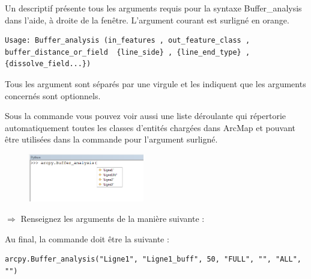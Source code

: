 \documentclass[11pt]{article}
\newcommand{\action}{$\Rightarrow$ }
\newcommand{\code}[1]{\lstinline{#1}}
\begin{document}
Un descriptif présente tous les arguments requis pour la syntaxe Buffer\_analysis dans l’aide, à droite de la fenêtre. L'argument courant est surligné en orange.
\begin{lstlisting}
Usage: Buffer_analysis (in_features , out_feature_class , buffer_distance_or_field  {line_side} , {line_end_type} , {dissolve_field...})
\end{lstlisting}

Tous les argument sont séparés par une virgule et les {} indiquent que les arguments concernés sont optionnels.

Sous la commande vous pouvez voir aussi une liste déroulante qui répertorie automatiquement toutes les classes d'entités chargées dans ArcMap et pouvant être utilisées dans la commande pour l'argument surligné.
\begin{figure}[H]
	\center \includegraphics[width=0.45\textwidth]{img/td3/python_console_aide.png}\\
\end{figure}

\action Renseignez les arguments de la manière suivante :

Au final, la commande doit être la suivante :
\begin{lstlisting}
arcpy.Buffer_analysis("Ligne1", "Ligne1_buff", 50, "FULL", "", "ALL", "")
\end{lstlisting}
\end{document}
